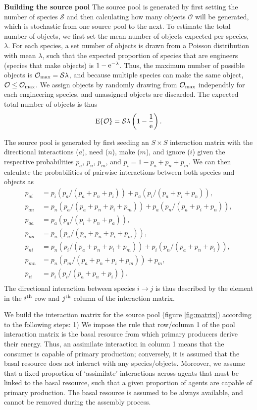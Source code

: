 \documentclass[twocolumn,preprintnumbers,amsmath,amssymb,superscriptaddress]{revtex4}
\begin{document}
\textbf{Building the source pool} The source pool is generated by first setting the number of species $\mathcal{S}$ and then calculating how many objects $\mathcal{O}$ will be generated, which is stochastic from one source pool to the next.
To estimate the total number of objects, we first set the mean number of objects expected per species, $\lambda$.
For each species, a set number of objects is drawn from a Poisson distribution with mean $\lambda$, such that the expected proportion of species that are engineers (species that make objects) is $1-{\rm e}^{-\lambda}$. 
Thus, the maximum number of possible objects is $\mathcal{O}_{\rm max} = \mathcal{S}\lambda$, and because multiple species can make the same object, $\mathcal{O} \leq \mathcal{O}_{\rm max}$.
We assign objects by randomly drawing from $\mathcal{O}_{\rm max}$ independtly for each engineering species, and unassigned objects are discarded.
The expected total number of objects is thus 
\begin{equation}
{\rm E}\{\mathcal{O}\} = \mathcal{S}\lambda\left(1 - \frac{1}{{\rm e}}\right).
\end{equation}

The source pool is generated by first seeding an $S \times S$ interaction matrix with the directional interactions ($a$), need ($n$), make ($m$), and ignore ($i$) given the respective probabilities $p_a$, $p_n$, $p_m$, and $p_i = 1 - p_a + p_n + p_m$. 
We can then calculate the probabilities of pairwise interactions between both species and objects as 
\begin{align}
  p_{ai} &= p_i(p_a/(p_a+p_n+p_i)) + p_a(p_i/(p_a+p_i+p_n)), \\ \nonumber
  p_{an} &= p_n(p_a/(p_a+p_n+p_i+p_m)) + p_a(p_n/(p_a+p_i+p_n)), \\ \nonumber
  p_{aa} &= p_a(p_a/(p_i+p_n+p_a)), \\ \nonumber
  p_{nn} &= p_n(p_n/(p_a+p_n+p_i+p_m)), \\ \nonumber
  p_{ni} &= p_n(p_i/(p_a+p_n+p_i+p_m)) + p_i(p_n/(p_a+p_n+p_i)), \\ \nonumber
  p_{mn} &= p_n(p_m/(p_a+p_n+p_i+p_m)) + p_m, \\ \nonumber
  p_{ii} &= p_i(p_i/(p_a+p_n+p_i)).\\ \nonumber
\end{align}
The directional interaction between species $i \rightarrow j$ is thus described by the element in the $i^{\rm th}$ row and $j^{\rm th}$ column of the interaction matrix.

We build the interaction matrix for the source pool (figure \ref{fig:matrix}) according to the following steps:
1) We impose the rule that row/column 1 of the pool interaction matrix is the basal resource from which primary producers derive their energy.
Thus, an assimilate interaction in column 1 means that the consumer is capable of primary production; conversely, it is assumed that the basal resource does not interact with any species/objects.
Moreover, we assume that a fixed proportion of `assimilate' interactions across agents that must be linked to the basal resource, such that a given proportion of agents are capable of primary production.
The basal resource is assumed to be always available, and cannot be removed during the assembly process.
\end{document}
